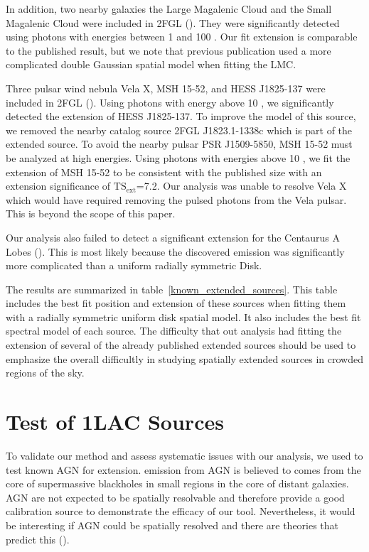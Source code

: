 \documentclass[12pt,preprint]{aastex}
\newcommand{\gev}{\text{GeV}\xspace}
\newcommand{\tsext}{{\ensuremath{\text{TS}_\text{ext}}}\xspace}
\newcommand{\pointlike}{\text{\em pointlike}\xspace}
\begin{document}

In addition, two nearby galaxies the Large Magalenic Cloud and the
Small Magalenic Cloud were included in 2FGL (\cite{lmc,smc}).  They were
significantly detected using photons with energies between 1 \gev and
100 \gev. Our fit extension is comparable to the published result,
but we note that previous publication used a more complicated double
Gaussian spatial model when fitting the LMC.

Three pulsar wind nebula Vela X, MSH 15-52, and HESS J1825-137 were
included in 2FGL (\cite{velax,msh1552,fermi_hess_j1825}).  Using photons
with energy above 10 \gev, we significantly detected the extension of
HESS J1825-137.  To improve the model of this source, we removed the
nearby catalog source 2FGL J1823.1-1338c which is part of the extended
source.  To avoid the nearby pulsar PSR J1509-5850, MSH 15-52 must be
analyzed at high energies.  Using photons with energies above 10 \gev,
we fit the extension of MSH 15-52 to be consistent with the published
size with an extension significance of \tsext=7.2.  Our analysis was
unable to resolve Vela X which would have required removing the pulsed
photons from the Vela pulsar. This is beyond the scope of this paper.

Our analysis also failed to detect a significant extension for the
Centaurus A Lobes (\cite{cen_a_lat}). This is most likely because the
discovered emission was significantly more complicated than a uniform
radially symmetric Disk.  

The results are summarized in table~\ref{known_extended_sources}.
This table includes the best fit position and extension of these
sources when fitting them with a radially symmetric uniform disk spatial
model.  It also includes the best fit spectral model of each source.
The difficulty that out analysis had fitting the extension of several
of the already published extended sources should be used to emphasize
the overall difficultly in studying spatially extended sources in crowded
regions of the sky.

\section{Test of 1LAC Sources}
\label{test_1lac_sources}

To validate our method and assess systematic issues with our analysis,
we used \pointlike to test known AGN for extension.
\gev emission from AGN is believed to comes from the core of supermassive
blackholes in small regions in the core of distant galaxies.  AGN are
not expected to be spatially resolvable and therefore provide a good
calibration source to demonstrate the efficacy of our tool. Nevertheless,
it would be interesting if AGN could be spatially resolved and
there are theories that predict this (\cite{pair_halo_paper}).
\end{document}
